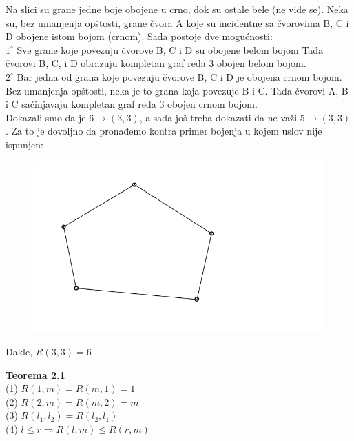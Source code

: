 \documentclass[12pt,a4paper]{article}
\begin{document}
	\noindent Na slici su grane jedne boje obojene u crno, dok su ostale bele (ne vide se).
	Neka su, bez umanjenja opštosti, grane čvora A koje su incidentne sa čvorovima B, C i D obojene istom bojom (crnom). Sada postoje dve mogućnosti: 
	\vspace{1em}
	\\
	$1^\circ$ Sve grane koje povezuju čvorove B, C i D su obojene belom bojom Tada čvorovi B, C, i D obrazuju kompletan graf reda 3 obojen belom bojom.
	\vspace{0.5em}
	\\
	$2^\circ$ Bar jedna od grana koje povezuju čvorove B, C i D je obojena crnom bojom. Bez umanjenja opštosti, neka je to grana koja povezuje B i C. Tada čvorovi A, B i C sačinjavaju kompletan graf reda 3 obojen crnom bojom.
	\vspace{0.5em}
	\\Dokazali smo da je $6 \rightarrow (3, 3)$, a sada još treba dokazati da ne važi $5 \rightarrow (3, 3)$. Za to je dovoljno da pronađemo kontra primer bojenja u kojem uslov nije ispunjen:
	\begin{figure}[h]
	\centering
	\includegraphics[scale=1.1]{r33kp.png}
	\end{figure}
	
	Dakle, $R(3,3)=6$ .	
	
	\newpage
	
	{\noindent\fontsize{12pt}{12pt}\textbf{Teorema 2.1}}
	\vspace{0.5em}	
	\\
	(1) {} {} $R(1, m) = R(m, 1) = 1$\\
	(2) {} {} $R(2, m) = R(m, 2) = m$\\
	(3) {} {} $R(l_{1}, l_{2}) = R(l_{2}, l_{1})$\\
	(4) {} {} $l \leq r \Rightarrow R(l, m) \leq R(r, m)$\\
	
\end{document}
